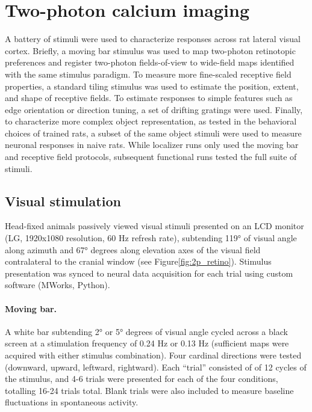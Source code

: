 \section{Two-photon calcium imaging}
A battery of stimuli were used to characterize responses across rat lateral visual cortex. Briefly, a moving bar stimulus was used to map two-photon retinotopic preferences and register two-photon fields-of-view to wide-field maps identified with the same stimulus paradigm. To measure more fine-scaled receptive field properties, a standard tiling stimulus was used to estimate the position, extent, and shape of receptive fields. To estimate responses to simple features such as edge orientation or direction tuning, a set of drifting gratings were used. Finally, to characterize more complex object representation, as tested in the behavioral choices of trained rats, a subset of the same object stimuli were used to measure neuronal responses in naive rats. While localizer runs only used the moving bar and receptive field protocols, subsequent functional runs tested the full suite of stimuli.  

\subsection{Visual stimulation}
Head-fixed animals passively viewed visual stimuli presented on an LCD monitor (LG, 1920x1080 resolution, 60 Hz refresh rate), subtending \ang{119} of visual angle along azimuth and \ang{67} degrees along elevation axes of the visual field contralateral to the cranial window (see Figure\ref{fig:2p_retino}). Stimulus presentation was synced to neural data acquisition for each trial using custom software (MWorks, Python). 

\paragraph{Moving bar.} A white bar subtending \ang{2} or \ang{5} degrees of visual angle cycled across a black screen at a stimulation frequency of 0.24 Hz or 0.13 Hz (sufficient maps were acquired with either stimulus combination). Four cardinal directions were tested (downward, upward, leftward, rightward). Each ``trial'' consisted of of 12 cycles of the stimulus, and 4-6 trials were presented for each of the four conditions, totalling 16-24 trials total. Blank trials were also included to measure baseline fluctuations in spontaneous activity.  

